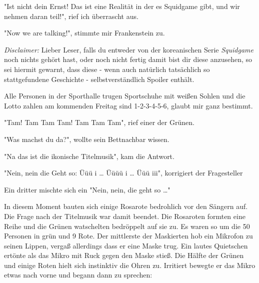 \documentclass[ebook]{article}
\begin{document}
\begin{center}
"Ist nicht dein Ernst! Das ist eine Realität in der es Squidgame
gibt, und wir nehmen daran teil!", rief ich überrascht aus.
\end{center}

\begin{center}
"Now we are talking!", stimmte mir Frankenstein zu.
\end{center}

\noindent \emph{Disclaimer:} Lieber Leser, falls du entweder von der
koreanischen Serie \emph{Squidgame} noch nichts gehört hast, oder noch
nicht fertig damit bist dir diese anzusehen, so sei hiermit gewarnt,
dass diese - wenn auch natürlich tatsächlich so stattgefundene
Geschichte - selbstverständlich Spoiler enthält.

\noindent Alle Personen in der Sporthalle trugen Sportschuhe mit
weißen Sohlen und die Lotto zahlen am kommenden Freitag sind
1-2-3-4-5-6, glaubt mir ganz bestimmt.

\begin{center}
"Tam! Tam Tam Tam! Tam Tam Tam", rief einer der Grünen.
\end{center}

\begin{center}
"Was machst du da?", wollte sein Bettnachbar wissen.
\end{center}

\begin{center}
"Na das ist die ikonische Titelmusik", kam die Antwort.
\end{center}

\begin{center}
"Nein, nein die Geht so: Üüü i \ldots{} Üüüü i \ldots{} Üüü iii", korrigiert
der Fragesteller
\end{center}

\begin{center}
Ein dritter mischte sich ein "Nein, nein, die geht so \ldots{}"
\end{center}

\noindent In diesem Moment bauten sich einige Rosarote bedrohlich
vor den Sängern auf. Die Frage nach der Titelmusik war damit
beendet. Die Rosaroten formten eine Reihe und die Grünen watschelten
bedröppelt auf sie zu. Es waren so um die 50 Personen in grün und 9
Rote. Der mittlerste der Maskierten hob ein Mikrofon zu seinen
Lippen, vergaß allerdings dass er eine Maske trug. Ein lautes
Quietschen ertönte als das Mikro mit Ruck gegen den Maske stieß. Die
Hälfte der Grünen und einige Roten hielt sich instinktiv die Ohren
zu. Irritiert bewegte er das Mikro etwas nach vorne und begann dann
zu sprechen:
\end{document}
